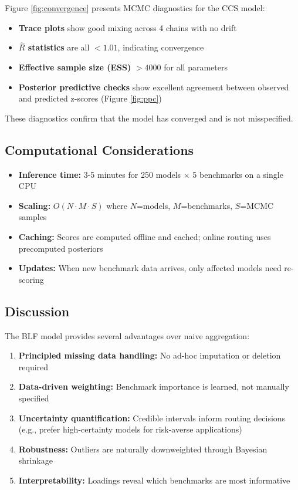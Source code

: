 Figure \ref{fig:convergence} presents MCMC diagnostics for the CCS model:

\begin{itemize}
    \item \textbf{Trace plots} show good mixing across 4 chains with no drift
    \item \textbf{$\hat{R}$ statistics} are all $< 1.01$, indicating convergence
    \item \textbf{Effective sample size (ESS)} $> 4000$ for all parameters
    \item \textbf{Posterior predictive checks} show excellent agreement between observed and predicted z-scores (Figure \ref{fig:ppc})
\end{itemize}

These diagnostics confirm that the model has converged and is not misspecified.

\subsection{Computational Considerations}

\begin{itemize}
    \item \textbf{Inference time:} 3-5 minutes for 250 models $\times$ 5 benchmarks on a single CPU
    \item \textbf{Scaling:} $O(N \cdot M \cdot S)$ where $N$=models, $M$=benchmarks, $S$=MCMC samples
    \item \textbf{Caching:} Scores are computed offline and cached; online routing uses precomputed posteriors
    \item \textbf{Updates:} When new benchmark data arrives, only affected models need re-scoring
\end{itemize}

\subsection{Discussion}

The BLF model provides several advantages over naive aggregation:

\begin{enumerate}
    \item \textbf{Principled missing data handling:} No ad-hoc imputation or deletion required
    \item \textbf{Data-driven weighting:} Benchmark importance is learned, not manually specified
    \item \textbf{Uncertainty quantification:} Credible intervals inform routing decisions (e.g., prefer high-certainty models for risk-averse applications)
    \item \textbf{Robustness:} Outliers are naturally downweighted through Bayesian shrinkage
    \item \textbf{Interpretability:} Loadings reveal which benchmarks are most informative
\end{enumerate}

